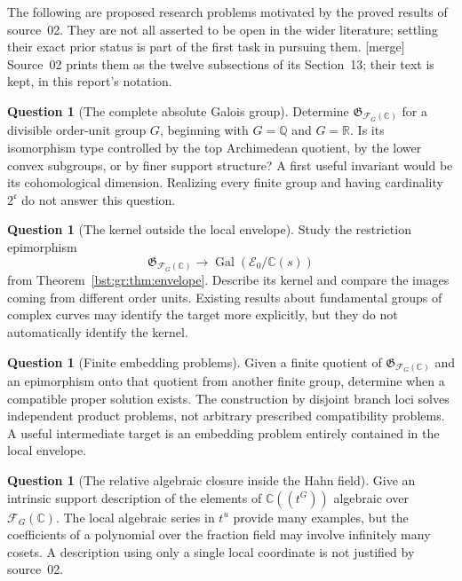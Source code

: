 \documentclass[11pt,letterpaper]{article}
\theoremstyle{definition}
\newtheorem{question}[theorem]{Question}
\theoremstyle{remark}
\newcommand{\Q}{\mathbb Q}
\newcommand{\R}{\mathbb R}
\newcommand{\C}{\mathbb C}
\newcommand{\HH}[2]{#1((t^{#2}))}
\newcommand{\FF}[2]{\mathcal F_{#2}(#1)}
\newcommand{\cc}{\mathfrak c}
\newcommand{\Gal}{\operatorname{Gal}}
\newcommand{\AbsGal}[1]{\mathfrak G_{#1}}
\begin{document}
The following are proposed research problems motivated by the proved results
of source~02. They are not all asserted to be open in the wider literature;
settling their exact prior status is part of the first task in pursuing them.
\textup{[merge]} Source~02 prints them as the twelve subsections of its
Section~13; their text is kept, in this report's notation.

\begin{question}[The complete absolute Galois group]\label{bst:gr:q:absolute}
Determine $\AbsGal{\FF{\C}G}$ for a divisible order-unit group $G$, beginning
with $G=\Q$ and $G=\R$. Is its isomorphism type controlled by the top
Archimedean quotient, by the lower convex subgroups, or by finer support
structure? A first useful invariant would be its cohomological dimension.
Realizing every finite group and having cardinality $2^{\cc}$ do not answer
this question.
\end{question}

\begin{question}[The kernel outside the local envelope]\label{bst:gr:q:kernel}
Study the restriction epimorphism
\[
 \AbsGal{\FF{\C}G}\longrightarrow\Gal(\mathcal E_0/\C(s))
\]
from Theorem~\ref{bst:gr:thm:envelope}. Describe its kernel and compare the
images coming from different order units. Existing results about fundamental
groups of complex curves may identify the target more explicitly, but they do
not automatically identify the kernel.
\end{question}

\begin{question}[Finite embedding problems]\label{bst:gr:q:embedding}
Given a finite quotient of $\AbsGal{\FF{\C}G}$ and an epimorphism onto that
quotient from another finite group, determine when a compatible proper
solution exists. The construction by disjoint branch loci solves independent
product problems, not arbitrary prescribed compatibility problems. A useful
intermediate target is an embedding problem entirely contained in the local
envelope.
\end{question}

\begin{question}[The relative algebraic closure inside the Hahn field]\label{bst:gr:q:relclosure}
Give an intrinsic support description of the elements of $\HH{\C}G$ algebraic
over $\FF{\C}G$. The local algebraic series in $t^u$ provide many examples,
but the coefficients of a polynomial over the fraction field may involve
infinitely many cosets. A description using only a single local coordinate is
not justified by source~02.
\end{question}
\end{document}
